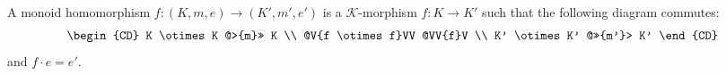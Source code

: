 A monoid homomorphism $f: (K, m, e) \longrightarrow (K', m', e')$ is a $\mathcal{K}$-morphism $f: K \longrightarrow K'$ such that the following diagram commutes:
$$
\begin{CD}
K \otimes K @>{m}>> K \\
@V{f \otimes f}VV @VV{f}V \\
K' \otimes K' @>>{m'}> K'
\end{CD}
$$
and $f \cdot e = e'$.
